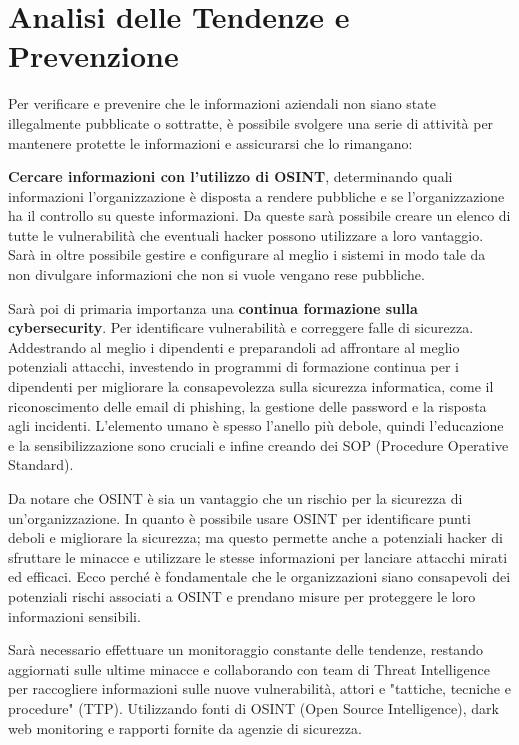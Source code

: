 \section{Analisi delle Tendenze e Prevenzione}\label{sec:cap_sec_impl5}

Per verificare e prevenire che le informazioni aziendali non siano state illegalmente pubblicate o sottratte, è possibile svolgere una serie di attività per mantenere protette le informazioni e assicurarsi che lo rimangano:

\textbf{Cercare informazioni con l'utilizzo di OSINT}, determinando quali informazioni l'organizzazione è disposta a rendere pubbliche e se l'organizzazione ha il controllo su queste informazioni. Da queste sarà possibile creare un elenco di tutte le vulnerabilità che eventuali hacker possono utilizzare a loro vantaggio. Sarà in oltre possibile gestire e configurare al meglio i sistemi in modo tale da non divulgare informazioni che non si vuole vengano rese pubbliche.

Sarà poi di primaria importanza una \textbf{continua formazione sulla cybersecurity}. Per identificare vulnerabilità e correggere falle di sicurezza. Addestrando al meglio i dipendenti e preparandoli ad affrontare al meglio potenziali attacchi, investendo in programmi di formazione continua per i dipendenti per migliorare la consapevolezza sulla sicurezza informatica, come il riconoscimento delle email di phishing, la gestione delle password e la risposta agli incidenti. L'elemento umano è spesso l'anello più debole, quindi l'educazione e la sensibilizzazione sono cruciali e infine creando dei SOP (Procedure Operative Standard).\cite{implic4}

Da notare che OSINT è sia un vantaggio che un rischio per la sicurezza di un'organizzazione. In quanto è possibile usare OSINT per identificare punti deboli e migliorare la sicurezza; ma questo permette anche a potenziali hacker di sfruttare le minacce e utilizzare le stesse informazioni per lanciare attacchi mirati ed efficaci. 
Ecco perché è fondamentale che le organizzazioni siano consapevoli dei potenziali rischi associati a OSINT e prendano misure per proteggere le loro informazioni sensibili.

Sarà necessario effettuare un monitoraggio constante delle tendenze, restando aggiornati sulle ultime minacce e collaborando con team di Threat Intelligence per raccogliere informazioni sulle nuove vulnerabilità, attori e "tattiche, tecniche e procedure" (TTP). Utilizzando fonti di OSINT (Open Source Intelligence), dark web monitoring e rapporti fornite da agenzie di sicurezza.


